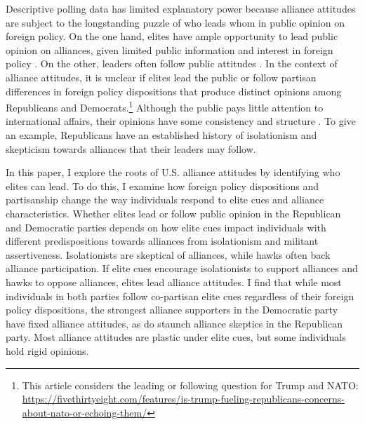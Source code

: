 \documentclass[12pt]{article}
\begin{document}
Descriptive polling data has limited explanatory power because alliance attitudes are subject to the longstanding puzzle of who leads whom in public opinion on foreign policy.
On the one hand, elites have ample opportunity to lead public opinion on alliances, given limited public information and interest in foreign policy \citep{Canes-Wrone2006, Druckman2014}.
On the other, leaders often follow public attitudes \citep{Barberaetal2019, HagerHilbig2020}.
In the context of alliance attitudes, it is unclear if elites lead the public or follow partisan differences in foreign policy dispositions that produce distinct opinions among Republicans and Democrats.\footnote{This article considers the leading or following question for Trump and NATO: \url{https://fivethirtyeight.com/features/is-trump-fueling-republicans-concerns-about-nato-or-echoing-them/}}
Although the public pays little attention to international affairs, their opinions have some consistency and structure \citep{Holsti1992, PageShapiro1992, KertzerZeitzoff2017}.
To give an example, Republicans have an established history of isolationism and skepticism towards alliances that their leaders may follow. 


In this paper, I explore the roots of U.S. alliance attitudes by identifying who elites can lead. 
To do this, I examine how foreign policy dispositions and partisanship change the way individuals respond to elite cues and alliance characteristics.
Whether elites lead or follow public opinion in the Republican and Democratic parties depends on how elite cues impact individuals with different predispositions towards alliances from isolationism and militant assertiveness.  
Isolationists are skeptical of alliances, while hawks often back alliance participation. 
If elite cues encourage isolationists to support alliances and hawks to oppose alliances, elites lead alliance attitudes. 
I find that while most individuals in both parties follow co-partisan elite cues regardless of their foreign policy dispositions, the strongest alliance supporters in the Democratic party have fixed alliance attitudes, as do staunch alliance skeptics in the Republican party. 
Most alliance attitudes are plastic under elite cues, but some individuals hold rigid opinions. 
\end{document}
